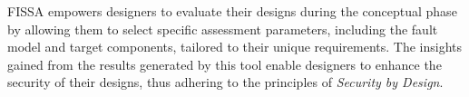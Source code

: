 FISSA empowers designers to evaluate their designs during the conceptual phase by allowing them to select specific assessment parameters, including the fault model and target components, tailored to their unique requirements. The insights gained from the results generated by this tool enable designers to enhance the security of their designs, thus adhering to the principles of \textit{Security by Design}.


